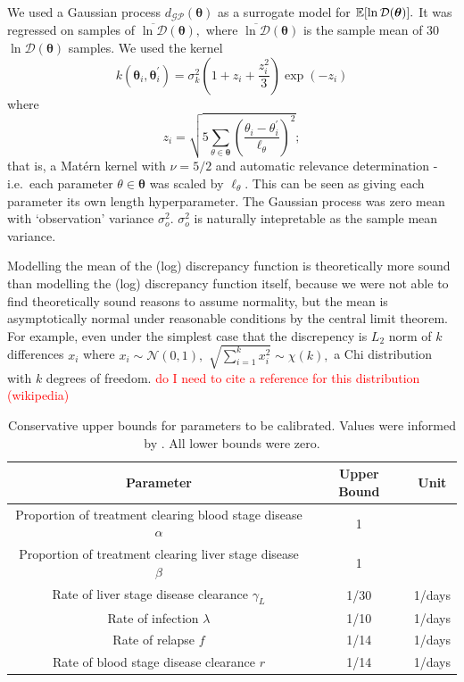 We used a Gaussian process $d_\mathcal{GP}(\bm{\theta})$ as a surrogate model for
$\operatorname{\mathbb{E}}[\ln\mathcal{D}(\bm{\theta})].$ It was regressed on samples of
$\overline{\ln\mathcal{D}}(\bm{\theta}),$ where 
$\overline{\ln\mathcal{D}}(\bm{\theta})$ is the sample mean of 30 
$\ln\mathcal{D}(\bm{\theta})$ samples.
We used the kernel
$$
    k(\bm{\theta}_i, \bm{\theta}_i^\prime)
    = \sigma_k^2 (1 + z_i + \frac{z_i^2}{3})\exp(-z_i)
$$
where
$$
    z_i = \sqrt{
        5 \sum_{\theta\in \bm{\theta}}\left(
        \frac{\theta_i - \theta_i^\prime}{\ell_\theta}
        \right)^2
    };
$$ that is, a Mat\'ern kernel with $\nu = 5/2$ and automatic
relevance determination - i.e.\ each parameter $\theta\in\bm{\theta}$ was
scaled by $\ell_\theta.$ This can be seen as giving each parameter its own
length hyperparameter. The Gaussian process was zero mean
with `observation' variance $\sigma^2_o.$ $\sigma^2_o$ is naturally 
intepretable as the sample mean variance.

Modelling the mean of the (log) discrepancy function is theoretically more 
sound than modelling the (log) discrepancy function itself, because 
we were not able to find theoretically sound reasons to assume normality,
but the mean is asymptotically normal under reasonable conditions by the
central limit theorem. For example, even under the simplest case that the
discrepency is $L_2$ norm of $k$ differences $x_i$ where
$x_i\sim\mathcal{N}(0, 1),$ $\sqrt{\sum_{i=1}^k x_i^2}\sim\chi(k),$ a Chi 
distribution with $k$ degrees of freedom. 
\textcolor{red}{
    do I need to cite a reference for this distribution (wikipedia)
} 

\begin{table}[htbp]
    \centering
    \begin{tabular}{c |c |c}
        Parameter                                                     & Upper Bound & Unit   \\
        \hline
        Proportion of treatment clearing blood stage disease $\alpha$ & 1           &        \\
        Proportion of treatment clearing liver stage disease $\beta$  & 1           &        \\
        Rate of liver stage disease clearance $\gamma_L$              & 1/30        & 1/days \\
        Rate of infection $\lambda$                                   & 1/10        & 1/days \\
        Rate of relapse $f$                                           & 1/14        & 1/days \\
        Rate of blood stage disease clearance $r$                     & 1/14        & 1/days
    \end{tabular}
    \caption{
        Conservative upper bounds for parameters to be calibrated.
        Values were informed by
        \cite{champagne_using_2022, white_variation_2016}. All lower bounds
        were zero.
    }
    \label{table:param_bounds}
\end{table}


